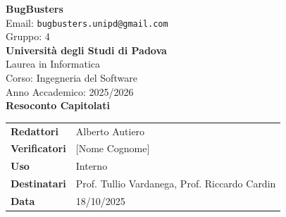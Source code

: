 \documentclass[a4paper,12pt]{article}
\begin{document}
\begin{center}
  
  {\Large\bfseries\color{primaryblue} BugBusters}\\[0.3cm]
  {\small\color{darkgray} Email: \texttt{bugbusters.unipd@gmail.com}} \\[0.1cm]
  {\small\color{darkgray} Gruppo: 4} \\[0.5cm]

  {\large\bfseries Università degli Studi di Padova}\\[0.3cm]
  {\small Laurea in Informatica}\\[0.2cm]
  {\small Corso: Ingegneria del Software}\\[0.2cm]
  {\small Anno Accademico: 2025/2026}\\[0.8cm]

  {\Huge\bfseries\color{primaryblue} Resoconto Capitolati}\\[0.8cm]
\end{center}

\begin{center}
\begin{tcolorbox}[colback=lightgray,colframe=primaryblue,width=0.85\textwidth,arc=3mm,boxrule=0.5pt]
\begin{tabular}{@{}ll@{}}
\textbf{Redattori}    & Alberto Autiero \\
\textbf{Verificatori} & [Nome Cognome] \\
\textbf{Uso}          & Interno \\
\textbf{Destinatari}  & Prof. Tullio Vardanega, Prof. Riccardo Cardin \\
\textbf{Data}         & 18/10/2025 \\
\end{tabular}
\end{tcolorbox}
\end{center}
\end{document}
